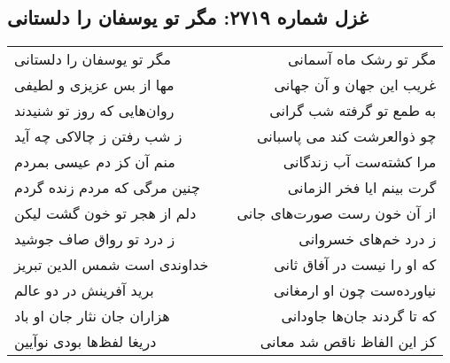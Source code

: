\begin{center}
\section*{غزل شماره ۲۷۱۹: مگر تو یوسفان را دلستانی}
\label{sec:2719}
\begin{longtable}{l p{0.5cm} r}
مگر تو یوسفان را دلستانی
&&
مگر تو رشک ماه آسمانی
\\
مها از بس عزیزی و لطیفی
&&
غریب این جهان و آن جهانی
\\
روان‌هایی که روز تو شنیدند
&&
به طمع تو گرفته شب گرانی
\\
ز شب رفتن ز چالاکی چه آید
&&
چو ذوالعرشت کند می پاسبانی
\\
منم آن کز دم عیسی بمردم
&&
مرا کشته‌ست آب زندگانی
\\
چنین مرگی که مردم زنده گردم
&&
گرت بینم ایا فخر الزمانی
\\
دلم از هجر تو خون گشت لیکن
&&
از آن خون رست صورت‌های جانی
\\
ز درد تو رواق صاف جوشید
&&
ز درد خم‌های خسروانی
\\
خداوندی است شمس الدین تبریز
&&
که او را نیست در آفاق ثانی
\\
برید آفرینش در دو عالم
&&
نیاورده‌ست چون او ارمغانی
\\
هزاران جان نثار جان او باد
&&
که تا گردند جان‌ها جاودانی
\\
دریغا لفظ‌ها بودی نوآیین
&&
کز این الفاظ ناقص شد معانی
\\
\end{longtable}
\end{center}
